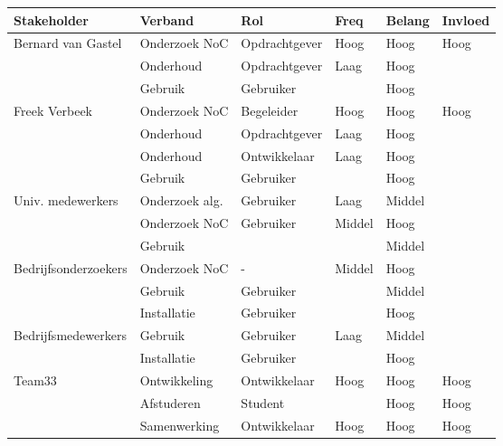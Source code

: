 {\small\sf
\begin{center}
\begin{tabular}{llllll}\hline
{\bf Stakeholder}    & {\bf Verband}   & {\bf Rol}     & {\bf Freq} & {\bf Belang} & {\bf Invloed}\\\hline
Bernard van Gastel   & Onderzoek NoC  & Opdrachtgever & Hoog       & Hoog   & Hoog \\
                     & Onderhoud      & Opdrachtgever & Laag       & Hoog   &  \\
                     & Gebruik        & Gebruiker     &            & Hoog   & \\
Freek Verbeek        & Onderzoek NoC  & Begeleider    & Hoog       & Hoog   & Hoog\\
                     & Onderhoud      & Opdrachtgever & Laag       & Hoog   & \\
                     & Onderhoud      & Ontwikkelaar  & Laag       & Hoog   & \\
                     & Gebruik        & Gebruiker     &            & Hoog   & \\
Univ. medewerkers    & Onderzoek alg. & Gebruiker     & Laag       & Middel & \\
                     & Onderzoek NoC  & Gebruiker     & Middel     & Hoog   & \\
                     & Gebruik        &               &            & Middel & \\
Bedrijfsonderzoekers & Onderzoek NoC  & -             & Middel     & Hoog   & \\
                     & Gebruik        & Gebruiker     &            & Middel & \\
                     & Installatie    & Gebruiker     &            & Hoog   & \\
Bedrijfsmedewerkers  & Gebruik        & Gebruiker     & Laag       & Middel & \\
                     & Installatie    & Gebruiker     &            & Hoog   & \\
Team33               & Ontwikkeling   & Ontwikkelaar  & Hoog       & Hoog   & Hoog\\
                     & Afstuderen     & Student       &            & Hoog   & Hoog\\
                     & Samenwerking   & Ontwikkelaar  & Hoog       & Hoog   & Hoog\\
\hline
\end{tabular}
\end{center}
}%

